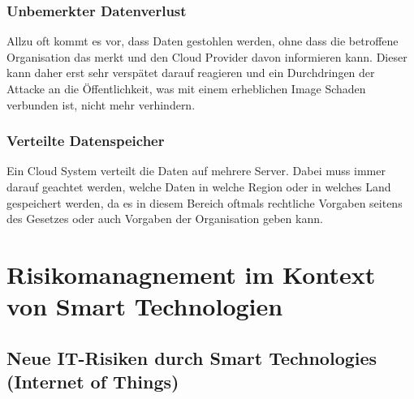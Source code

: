\documentclass{report}
\begin{document}
\subsection{Unbemerkter Datenverlust}
Allzu oft kommt es vor, dass Daten gestohlen werden, ohne dass die betroffene Organisation das merkt und den Cloud Provider davon informieren kann. Dieser kann daher erst sehr verspätet darauf reagieren und ein Durchdringen der Attacke an die Öffentlichkeit, was mit einem erheblichen Image Schaden verbunden ist, nicht mehr verhindern.\cite{mos2011}

\subsection{Verteilte Datenspeicher}
Ein Cloud System verteilt die Daten auf mehrere Server. Dabei muss immer darauf geachtet werden, welche Daten in welche Region oder in welches Land gespeichert werden, da es in diesem Bereich oftmals rechtliche Vorgaben seitens des Gesetzes oder auch Vorgaben der Organisation geben kann. \cite{mos2011}





\chapter{Risikomanagnement im Kontext von Smart Technologien}
\label{sect:relevance}

\section{Neue IT-Risiken durch Smart Technologies (Internet of Things)}
\end{document}
